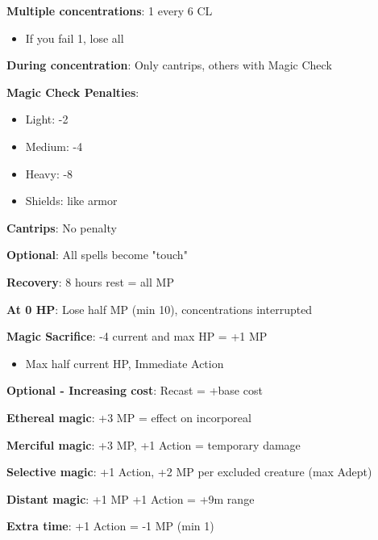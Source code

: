 \documentclass[10pt,a4paper,landscape]{article}
\begin{document}
\begin{multicols}{3}
\begin{tcolorbox}[title=CONCENTRATION]
			\textbf{Multiple concentrations}: 1 every 6 CL
			\begin{itemize}[leftmargin=*,noitemsep]
				\item If you fail 1, lose all
			\end{itemize}
			
			\textbf{During concentration}: Only cantrips, others with Magic Check
		\end{tcolorbox}
		
		\begin{tcolorbox}[title=ARMOR AND MAGIC]
			\textbf{Magic Check Penalties}:
			\begin{itemize}[leftmargin=*,noitemsep]
				\item Light: -2
				\item Medium: -4  
				\item Heavy: -8
				\item Shields: like armor
			\end{itemize}
			
			\textbf{Cantrips}: No penalty
			
			\textbf{Optional}: All spells become "touch"
		\end{tcolorbox}
		
		\begin{tcolorbox}[title=MAGIC POINTS MANAGEMENT]
			\textbf{Recovery}: 8 hours rest = all MP
			
			\textbf{At 0 HP}: Lose half MP (min 10), concentrations interrupted
			
			\textbf{Magic Sacrifice}: -4 current and max HP = +1 MP
			\begin{itemize}[leftmargin=*,noitemsep]
				\item Max half current HP, Immediate Action
			\end{itemize}
			
			\textbf{Optional - Increasing cost}: Recast = +base cost
		\end{tcolorbox}
		
		\begin{tcolorbox}[title=MAGIC ALTERATIONS]
			\textbf{Ethereal magic}: +3 MP = effect on incorporeal
			
			\textbf{Merciful magic}: +3 MP, +1 Action = temporary damage
			
			\textbf{Selective magic}: +1 Action, +2 MP per excluded creature (max Adept)
			
			\textbf{Distant magic}: +1 MP +1 Action = +9m range
			
			\textbf{Extra time}: +1 Action = -1 MP (min 1)
			

\end{tcolorbox}
\end{multicols}
\end{document}
